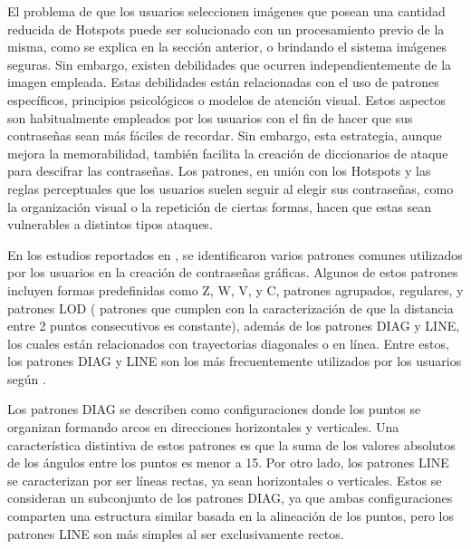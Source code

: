 \documentclass[12pt]{report}
\begin{document}
El problema de que los usuarios seleccionen imágenes que posean una cantidad reducida de Hotspots puede ser solucionado con un procesamiento previo de la misma, como se explica en la sección anterior, o brindando el sistema imágenes seguras. Sin embargo, existen debilidades que ocurren independientemente de la imagen empleada. Estas debilidades están relacionadas con el uso de patrones específicos, principios psicológicos o modelos de atención visual. Estos aspectos son habitualmente empleados por los usuarios con el fin de hacer que sus contraseñas sean más fáciles de recordar. Sin embargo, esta estrategia, aunque mejora la memorabilidad, también facilita la creación de diccionarios de ataque para descifrar las contraseñas. Los patrones, en unión con los Hotspots y las reglas perceptuales que los usuarios suelen seguir al elegir sus contraseñas, como la organización visual o la repetición de ciertas formas, hacen que estas sean vulnerables a distintos tipos  ataques.



En los estudios reportados en \cite{5,20,21,22,23,24,25}, se identificaron varios patrones comunes utilizados por los usuarios en la creación de contraseñas gráficas. Algunos de estos patrones incluyen formas predefinidas como Z, W, V, y C, patrones agrupados, regulares, y patrones LOD ( patrones que cumplen con la caracterización de que la distancia entre 2 puntos consecutivos es constante), además de los patrones DIAG y LINE, los cuales están relacionados con trayectorias diagonales o en línea. Entre estos, los patrones DIAG y LINE son los más frecuentemente utilizados por los usuarios según \cite{5}.

Los patrones DIAG se describen como configuraciones donde los puntos se organizan formando arcos en direcciones horizontales y verticales. Una característica distintiva de estos patrones es que la suma de los valores absolutos de los ángulos entre los puntos es menor a 15\degree. Por otro lado, los patrones LINE se caracterizan por ser líneas rectas, ya sean horizontales o verticales. Estos se consideran un subconjunto de los patrones DIAG, ya que ambas configuraciones comparten una estructura similar basada en la alineación de los puntos, pero los patrones LINE son más simples al ser exclusivamente rectos.
\end{document}
